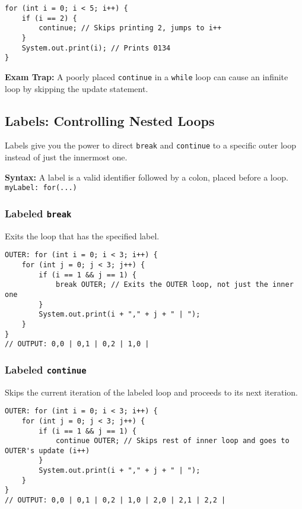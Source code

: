 \documentclass[12pt]{article}
\begin{document}
\begin{enumerate}[label=(\arabic*)]
\begin{verbatim}
for (int i = 0; i < 5; i++) {
    if (i == 2) {
        continue; // Skips printing 2, jumps to i++
    }
    System.out.print(i); // Prints 0134
}
\end{verbatim}
\textbf{Exam Trap:} A poorly placed \texttt{continue} in a \texttt{while} loop can cause an infinite loop by skipping the update statement.

\subsection*{Labels: Controlling Nested Loops}
Labels give you the power to direct \texttt{break} and \texttt{continue} to a specific outer loop instead of just the innermost one.

\textbf{Syntax:} A label is a valid identifier followed by a colon, placed before a loop. \texttt{myLabel: for(...)}

\subsubsection*{Labeled \texttt{break}}
Exits the loop that has the specified label.
\begin{verbatim}
OUTER: for (int i = 0; i < 3; i++) {
    for (int j = 0; j < 3; j++) {
        if (i == 1 && j == 1) {
            break OUTER; // Exits the OUTER loop, not just the inner one
        }
        System.out.print(i + "," + j + " | ");
    }
}
// OUTPUT: 0,0 | 0,1 | 0,2 | 1,0 | 
\end{verbatim}

\subsubsection*{Labeled \texttt{continue}}
Skips the current iteration of the labeled loop and proceeds to its next iteration.
\begin{verbatim}
OUTER: for (int i = 0; i < 3; i++) {
    for (int j = 0; j < 3; j++) {
        if (i == 1 && j == 1) {
            continue OUTER; // Skips rest of inner loop and goes to OUTER's update (i++)
        }
        System.out.print(i + "," + j + " | ");
    }
}
// OUTPUT: 0,0 | 0,1 | 0,2 | 1,0 | 2,0 | 2,1 | 2,2 | 
\end{verbatim}


\end{enumerate}
\end{document}
